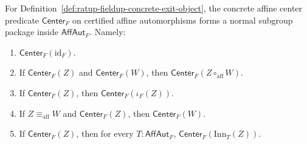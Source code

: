 \begin{theorem}
\label{thm:ratup-fieldup-affine-center-normal-subgroup}
For Definition~\ref{def:ratup-fieldup-concrete-exit-object}, the concrete
affine center predicate $\mathsf{Center}_F$ on certified affine automorphisms
forms a normal subgroup package inside $\mathsf{AffAut}_F$. Namely:
\begin{enumerate}
\item $\mathsf{Center}_F(\mathrm{id}_F)$.
\item If $\mathsf{Center}_F(Z)$ and $\mathsf{Center}_F(W)$, then
$\mathsf{Center}_F(Z\circ_{\mathrm{aff}}W)$.
\item If $\mathsf{Center}_F(Z)$, then
$\mathsf{Center}_F(\iota_F(Z))$.
\item If $Z\equiv_{\mathrm{aff}}W$ and $\mathsf{Center}_F(Z)$, then
$\mathsf{Center}_F(W)$.
\item If $\mathsf{Center}_F(Z)$, then for every
$T:\mathsf{AffAut}_F$,
$\mathsf{Center}_F(\mathrm{Inn}_T(Z))$.
\end{enumerate}
\end{theorem}
